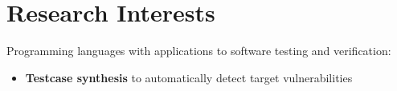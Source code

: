 \section{Research Interests}
Programming languages with applications to software testing and verification:

\renewcommand{\labelitemi}{$\blacktriangleright$}
\addtolength{\leftmargini}{0.3cm}

\begin{itemize}
\vspace{2mm}
\item \textbf{Testcase synthesis} to automatically detect target vulnerabilities
\end{itemize}

\vspace{9mm}
